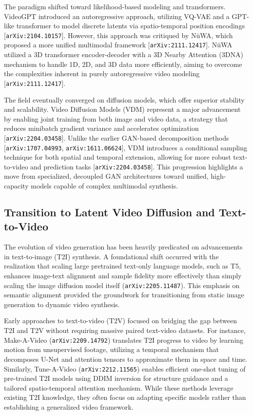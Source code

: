 \documentclass[11pt]{article}
\begin{document}
The paradigm shifted toward likelihood-based modeling and transformers. VideoGPT introduced an autoregressive approach, utilizing VQ-VAE and a GPT-like transformer to model discrete latents via spatio-temporal position encodings [\texttt{arXiv:2104.10157}]. However, this approach was critiqued by NüWA, which proposed a more unified multimodal framework [\texttt{arXiv:2111.12417}]. NüWA utilized a 3D transformer encoder-decoder with a 3D Nearby Attention (3DNA) mechanism to handle 1D, 2D, and 3D data more efficiently, aiming to overcome the complexities inherent in purely autoregressive video modeling [\texttt{arXiv:2111.12417}].

The field eventually converged on diffusion models, which offer superior stability and scalability. Video Diffusion Models (VDM) represent a major advancement by enabling joint training from both image and video data, a strategy that reduces minibatch gradient variance and accelerates optimization [\texttt{arXiv:2204.03458}]. Unlike the earlier GAN-based decomposition methods [\texttt{arXiv:1707.04993}, \texttt{arXiv:1611.06624}], VDM introduces a conditional sampling technique for both spatial and temporal extension, allowing for more robust text-to-video and prediction tasks [\texttt{arXiv:2204.03458}]. This progression highlights a move from specialized, decoupled GAN architectures toward unified, high-capacity models capable of complex multimodal synthesis.

\subsection{Transition to Latent Video Diffusion and Text-to-Video}

The evolution of video generation has been heavily predicated on advancements in text-to-image (T2I) synthesis. A foundational shift occurred with the realization that scaling large pretrained text-only language models, such as T5, enhances image-text alignment and sample fidelity more effectively than simply scaling the image diffusion model itself (\texttt{arXiv:2205.11487}). This emphasis on semantic alignment provided the groundwork for transitioning from static image generation to dynamic video synthesis.

Early approaches to text-to-video (T2V) focused on bridging the gap between T2I and T2V without requiring massive paired text-video datasets. For instance, Make-A-Video (\texttt{arXiv:2209.14792}) translates T2I progress to video by learning motion from unsupervised footage, utilizing a temporal mechanism that decomposes U-Net and attention tensors to approximate them in space and time. Similarly, Tune-A-Video (\texttt{arXiv:2212.11565}) enables efficient one-shot tuning of pre-trained T2I models using DDIM inversion for structure guidance and a tailored spatio-temporal attention mechanism. While these methods leverage existing T2I knowledge, they often focus on adapting specific models rather than establishing a generalized video framework.
\end{document}
